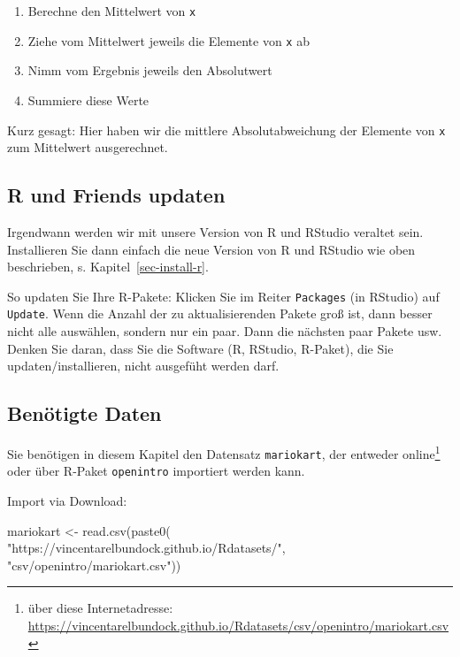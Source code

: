 \documentclass[
  letterpaper,
  twoside,
  open=any]{scrbook}
\newenvironment{Shaded}{\begin{snugshade}}{\end{snugshade}}
\newcommand{\FunctionTok}[1]{\textcolor[rgb]{0.28,0.35,0.67}{#1}}
\newcommand{\NormalTok}[1]{\textcolor[rgb]{0.00,0.23,0.31}{#1}}
\newcommand{\OtherTok}[1]{\textcolor[rgb]{0.00,0.23,0.31}{#1}}
\newcommand{\StringTok}[1]{\textcolor[rgb]{0.13,0.47,0.30}{#1}}
\providecommand{\tightlist}{%
  \setlength{\itemsep}{0pt}\setlength{\parskip}{0pt}}\usepackage{longtable,booktabs,array}
\theoremstyle{definition}
\theoremstyle{definition}
\theoremstyle{definition}
\theoremstyle{remark}
\begin{document}
\begin{enumerate}
\def\labelenumi{\arabic{enumi}.}
\tightlist
\item
  Berechne den Mittelwert von \texttt{x}
\item
  Ziehe vom Mittelwert jeweils die Elemente von \texttt{x} ab
\item
  Nimm vom Ergebnis jeweils den Absolutwert
\item
  Summiere diese Werte
\end{enumerate}

Kurz gesagt: Hier haben wir die mittlere Absolutabweichung der Elemente
von \texttt{x} zum Mittelwert ausgerechnet.

\subsection{R und Friends updaten}\label{r-und-friends-updaten}

Irgendwann werden wir mit unsere Version von R und RStudio veraltet
sein. Installieren Sie dann einfach die neue Version von R und RStudio
wie oben beschrieben, s. Kapitel~\ref{sec-install-r}.

So updaten Sie Ihre R-Pakete: Klicken Sie im Reiter \texttt{Packages}
(in RStudio) auf \texttt{Update}. Wenn die Anzahl der zu
aktualisierenden Pakete groß ist, dann besser nicht alle auswählen,
sondern nur ein paar. Dann die nächsten paar Pakete usw. Denken Sie
daran, dass Sie die Software (R, RStudio, R-Paket), die Sie
updaten/installieren, nicht ausgefüht werden darf.

\subsection{Benötigte Daten}\label{benuxf6tigte-daten-1}

Sie benötigen in diesem Kapitel den Datensatz \texttt{mariokart}, der
entweder online\footnote{ über diese Internetadresse:
  \url{https://vincentarelbundock.github.io/Rdatasets/csv/openintro/mariokart.csv}}
oder über R-Paket \texttt{openintro} importiert werden kann.

Import via Download:

\begin{Shaded}
\begin{Highlighting}[]
\NormalTok{mariokart }\OtherTok{\textless{}{-}} \FunctionTok{read.csv}\NormalTok{(}\FunctionTok{paste0}\NormalTok{(}
  \StringTok{"https://vincentarelbundock.github.io/Rdatasets/"}\NormalTok{,}
  \StringTok{"csv/openintro/mariokart.csv"}\NormalTok{))}
\end{Highlighting}
\end{Shaded}
\end{document}
